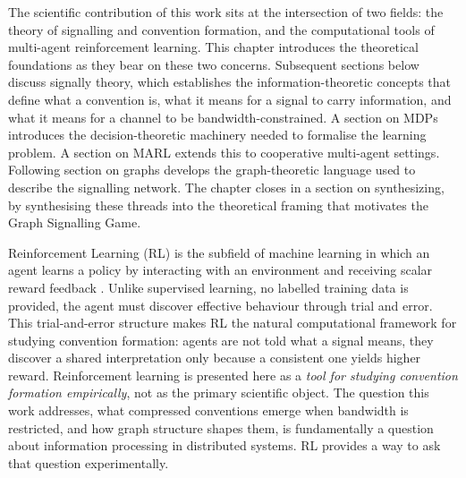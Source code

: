 \documentclass[a4paper,twoside,12pt]{report}
\begin{document}
    
    
    
    
    The scientific contribution of this work sits at the intersection of two
    fields: the theory of signalling and convention formation, and the
    computational tools of multi-agent reinforcement learning. This chapter
    introduces the theoretical foundations as they bear on these two
    concerns. Subsequent sections below discuss signally theory, which establishes the information-theoretic concepts that define what a convention is, what it means for a signal to carry information, and what it means for a channel to be bandwidth-constrained. A section on MDPs introduces the decision-theoretic machinery needed to formalise the learning problem.
    A section on MARL extends this to cooperative multi-agent settings.
    Following section on graphs develops the graph-theoretic language used to
    describe the signalling network. The chapter closes in a section on synthesizing,  by synthesising these threads
    into the theoretical framing that motivates the Graph Signalling Game.
    \newline 
    
    Reinforcement Learning (RL) is the subfield of machine learning in which
    an agent learns a policy by interacting with an environment and receiving
    scalar reward feedback \citep{sutton2018}. Unlike supervised learning, no
    labelled training data is provided, the agent must discover effective
    behaviour through trial and error. This trial-and-error structure makes RL
    the natural computational framework for studying convention formation:
    agents are not told what a signal means, they discover a shared
    interpretation only because a consistent one yields higher reward.
    Reinforcement learning is presented here as a \emph{tool for studying
    convention formation empirically}, not as the primary scientific object.
    The question this work addresses, what compressed conventions emerge
    when bandwidth is restricted, and how graph structure shapes them,
    is fundamentally a question about information processing in distributed
    systems. RL provides a way to ask that question experimentally.
    \newline
    
\end{document}
